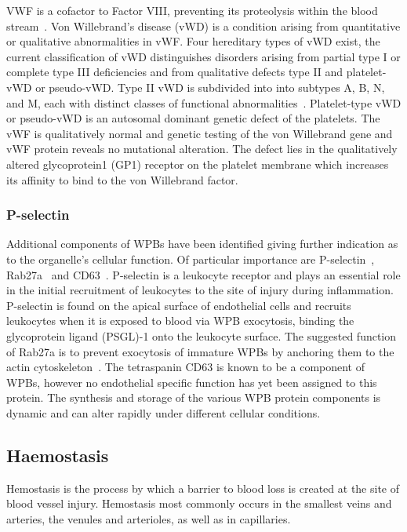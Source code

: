 VWF is a cofactor to Factor VIII, preventing its proteolysis within the blood stream~\cite{Sadler1998}. Von Willebrand's disease (vWD) is a condition arising from quantitative or qualitative abnormalities in vWF. Four hereditary types of vWD exist, the current classification of vWD distinguishes disorders arising from partial type I or complete type III deficiencies and from qualitative defects type II and platelet-vWD or pseudo-vWD. Type II vWD is subdivided into into subtypes A, B, N, and M, each with distinct classes of functional abnormalities~\cite{Ewenstein1997}. Platelet-type vWD or pseudo-vWD is an autosomal dominant genetic defect of the platelets. The vWF is qualitatively normal and genetic testing of the von Willebrand gene and vWF protein reveals no mutational alteration. The defect lies in the qualitatively altered glycoprotein1 (GP1) receptor on the platelet membrane which increases its affinity to bind to the von Willebrand factor.

\subsubsection{P-selectin}
\label{introduction:endothelial_cellular_biology:p-selectin}
Additional components of WPBs have been identified giving further indication as to the organelle's cellular function. Of particular importance are P-selectin~\cite{Bonfanti1989,McEver1989}, Rab27a~\cite{Hannah2003} and CD63~\cite{Vischer1993}. P-selectin is a leukocyte receptor and plays an essential role in the initial recruitment of leukocytes to the site of injury during inflammation. P-selectin is found on the apical surface of endothelial cells and recruits leukocytes when it is exposed to blood via WPB exocytosis, binding the glycoprotein ligand (PSGL)-1 onto the leukocyte surface. The suggested function of Rab27a is to prevent exocytosis of immature WPBs by anchoring them to the actin cytoskeleton~\cite{Nightingale2009}. The tetraspanin CD63 is known to be a component of WPBs, however no endothelial specific function has yet been assigned to this protein. The synthesis and storage of the various WPB protein components is dynamic and can alter rapidly under different cellular conditions.

\subsection{Haemostasis}
Hemostasis is the process by which a barrier to blood loss is created at the site of blood vessel injury. Hemostasis most commonly occurs in the smallest veins and arteries, the venules and arterioles, as well as in capillaries. 

